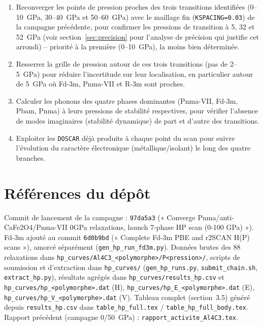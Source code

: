 \documentclass[11pt,a4paper]{article}
\begin{document}
\begin{enumerate}[label=(\roman*)]
  \item Reconverger les points de pression proches des trois transitions identifiées
  (0--10~GPa, 30--40~GPa et 50--60~GPa) avec le maillage fin (\texttt{KSPACING=0.03}) de la
  campagne précédente, pour confirmer les pressions de transition à 5, 32 et 52~GPa (voir
  section~\ref{sec:precision} pour l'analyse de précision qui justifie cet arrondi) --
  priorité à la première (0--10~GPa), la moins bien déterminée.
  \item Resserrer la grille de pression autour de ces trois transitions (pas de 2--5~GPa) pour
  réduire l'incertitude sur leur localisation, en particulier autour de 5~GPa où Fd-3m,
  Pnma-VII et R-3m sont proches.
  \item Calculer les phonons des quatre phases dominantes (Pnma-VII, Fd-3m, Pbam, Pnma) à leurs
  pressions de stabilité respectives, pour vérifier l'absence de modes imaginaires
  (stabilité dynamique) de part et d'autre des transitions.
  \item Exploiter les \texttt{DOSCAR} déjà produits à chaque point du scan pour suivre
  l'évolution du caractère électronique (métallique/isolant) le long des quatre branches.
\end{enumerate}

\appendix
\section{Références du dépôt}

Commit de lancement de la campagne : \texttt{97da5a3} (« Converge Pnma/anti-CaFe2O4/Pnma-VII
0GPa relaxations, launch 7-phase HP scan (0-100 GPa) »). Fd-3m ajouté au commit
\texttt{6d0b9bd} (« Complete Fd-3m PBE and r2SCAN H(P) scans »), amorcé séparément
(\texttt{gen\_hp\_run\_fd3m.py}). Données brutes des 88 relaxations dans
\texttt{hp\_curves/Al4C3\_<polymorphe>/P<pression>/}, scripts de soumission et d'extraction dans
\texttt{hp\_curves/} (\texttt{gen\_hp\_runs.py}, \texttt{submit\_chain.sh},
\texttt{extract\_hp.py}), résultats agrégés dans \texttt{hp\_curves/results\_hp.csv} et
\texttt{hp\_curves/hp\_<polymorphe>.dat} (H), \texttt{hp\_curves/hp\_E\_<polymorphe>.dat} (E),
\texttt{hp\_curves/hp\_V\_<polymorphe>.dat} (V). Tableau complet (section~3.5) généré depuis
\texttt{results\_hp.csv} dans \texttt{table\_hp\_full.tex} /
\texttt{table\_hp\_full\_body.tex}. Rapport précédent (campagne 0/50~GPa) :
\texttt{rapport\_activite\_Al4C3.tex}.
\end{document}
